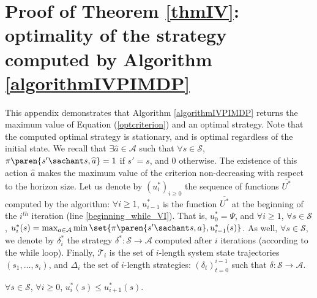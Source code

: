 \section{Proof of Theorem \ref{thmIV}: optimality of the strategy computed by Algorithm \ref{algorithmIVPIMDP}}
\label{proofThmIV}
This appendix demonstrates that Algorithm \ref{algorithmIVPIMDP} returns the
 maximum value of Equation (\ref{optcriterion}) and an optimal strategy. 
Note that the computed optimal strategy is stationary,
and is optimal regardless of the initial state. 
We recall that $\exists \widehat{a} \in \mathcal{A}$ such that $\forall s \in \mathcal{S}$, 
$\pi \paren{ s' \sachant s,\widehat{a} } = 1$ if $s'=s$, and $0$ otherwise. 
The existence of this action $\widehat{a}$ makes the maximum value of the criterion 
non-decreasing with respect to the horizon size.
Let us denote by $(u^*_i)_{i \geqslant 0}$ 
the sequence of functions $\overline{U^*}$
computed by the algorithm: $\forall i\geqslant 1$, 
$u^*_{i-1}$ is the function $\overline{U^*}$
at the beginning of the $i^{th}$ iteration (line \ref{beginning_while_VI}).
That is, $u^*_0 = \Psi$, and $\forall i \geqslant 1$, $\forall s \in \mathcal{S}$, 
$u^*_{i}(s) = \max_{a \in \mathcal{A}} \min \set{ \pi \paren{s' \sachant s,a}, u^*_{i-1}(s) }$.
As well, $\forall s \in \mathcal{S}$,
we denote by $\delta^*_i$ 
the strategy $\delta^*: \mathcal{S} \rightarrow \mathcal{A}$ 
computed after $i$ iterations (according to the while loop).
Finally, $\mathcal{T}_i$ is the set of $i$-length
system state trajectories $(s_1,\ldots,s_i)$,
and $\Delta_i$ the set of $i$-length strategies:
$(\delta_t)_{t=0}^{i-1}$ such that $\delta: \mathcal{S} \rightarrow \mathcal{A}$.
\begin{Lemma} \label{nondecreasingU}
 $\forall s \in \mathcal{S}$, $\forall i \geqslant 0$, $u^*_i(s) \leqslant u^*_{i+1}(s)$. 
\end{Lemma}
